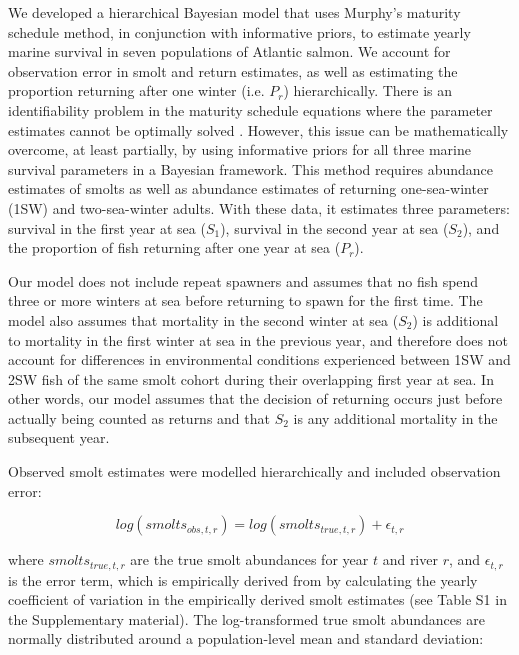 \documentclass[12pt]{article}
\newcommand{\So}{$S_{1}$\xspace}
\newcommand{\St}{$S_{2}$\xspace}
\newcommand{\Pg}{$P_r$\xspace}
\newcommand{\comment}[1]{\par {\bfseries \color{blue} #1 \par}} %
\begin{document}
We developed a hierarchical Bayesian model that uses Murphy's maturity
schedule method, in conjunction with informative priors, to estimate yearly
marine survival in seven populations of Atlantic salmon. We account for
observation error in smolt and return estimates, as well as estimating the
proportion returning after one winter (i.e. \Pg) hierarchically.
There is an identifiability problem in the maturity schedule equations where
the parameter estimates cannot be optimally solved \citep{Chaput2003a}.
However, this issue can be mathematically overcome, at least partially, by
using informative priors for all three marine survival parameters in a
Bayesian framework.
This method requires abundance estimates of smolts as well as abundance estimates
of returning one-sea-winter (1SW) and two-sea-winter adults. With these data,
it estimates three parameters: survival in the first year at sea (\So), survival
in the second year at sea (\St), and the proportion of fish returning after one
year at sea (\Pg). 

Our model does not include repeat spawners and assumes that no fish spend
three or more winters at sea before returning to spawn for the first time.
The model also assumes that mortality in the second winter at sea (\St)
is additional to mortality in the first winter at sea in the previous year, 
and therefore does not account for differences in environmental conditions experienced
between 1SW and 2SW fish of the same smolt cohort during their overlapping first year at sea.
In other words, our model assumes that the decision of returning occurs just before
actually being counted as returns and that \St is any additional mortality in
the subsequent year. 


Observed smolt estimates were modelled hierarchically and included
observation error:

\begin{equation}
log(smolts_{obs,t,r}) = log(smolts_{true,t,r}) + \epsilon_{t,r}
\end{equation}

where $smolts_{true,t,r}$ are the true smolt abundances for year $t$ and river
$r$, and $\epsilon_{t,r}$ is the error term, which is empirically derived from
by calculating the yearly coefficient of variation in the empirically derived
smolt estimates (see Table S1 in the Supplementary material). 
The log-transformed true smolt abundances are
normally distributed around a population-level mean and standard deviation:
\end{document}
